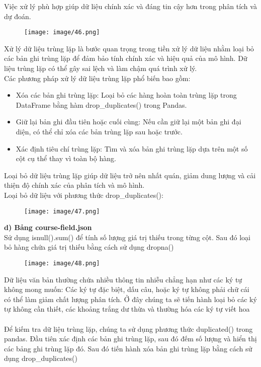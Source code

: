 Việc xử lý phù hợp giúp dữ liệu chính xác và đáng tin cậy hơn trong phân tích và dự đoán.\\
\newpage
\begin{figure}
    \centering
    \texttt{[image: image/46.png]}
\end{figure}
Xử lý dữ liệu trùng lặp là bước quan trọng trong tiền xử lý dữ liệu nhằm loại bỏ các bản ghi trùng lặp để đảm bảo tính chính xác và hiệu quả của mô hình. Dữ liệu trùng lặp có thể gây sai lệch và làm chậm quá trình xử lý.\\
Các phương pháp xử lý dữ liệu trùng lặp phổ biến bao gồm:\\
\begin{itemize}
    \item Xóa các bản ghi trùng lặp: Loại bỏ các hàng hoàn toàn trùng lặp trong DataFrame bằng hàm drop\_duplicates() trong Pandas.
    \item Giữ lại bản ghi đầu tiên hoặc cuối cùng: Nếu cần giữ lại một bản ghi đại diện, có thể chỉ xóa các bản trùng lặp sau hoặc trước.
    \item Xác định tiêu chí trùng lặp: Tìm và xóa bản ghi trùng lặp dựa trên một số cột cụ thể thay vì toàn bộ hàng.
\end{itemize}
Loại bỏ dữ liệu trùng lặp giúp dữ liệu trở nên nhất quán, giảm dung lượng và cải thiện độ chính xác của phân tích và mô hình.\\
Loại bỏ dữ liệu với phương thức drop\_duplicates():
\newpage
\begin{figure}
    \centering
    \texttt{[image: image/47.png]}
\end{figure}
\textbf{d) Bảng course-field.json}\\
Sử dụng isnull().sum() để tính số lượng giá trị thiếu trong từng cột. Sau đó loại bỏ hàng chứa giá trị thiếu bằng cách sử dụng dropna()
\newpage
\begin{figure}
    \centering
    \texttt{[image: image/48.png]}
\end{figure}
Dữ liệu văn bản thường chứa nhiều thông tin nhiễu chẳng hạn như các ký tự không mong muốn: Các ký tự đặc biệt, dấu câu, hoặc ký tự không phải chữ cái có thể làm giảm chất lượng phân tích. Ở đây chúng ta sẽ tiến hành loại bỏ các ký tự không cần thiết, các khoảng trắng dư thừa và thường hóa các ký tự viết hoa\\
\\
Để kiếm tra dữ liệu trùng lặp, chúng ta sử dụng phương thức duplicated() trong pandas. Đầu tiên xác định các bản ghi trùng lặp, sau đó đếm số lượng và hiển thị các bảng ghi trùng lặp đó. Sau đó tiến hành xóa bản ghi trùng lặp bằng cách sử dụng drop\_duplicates()
